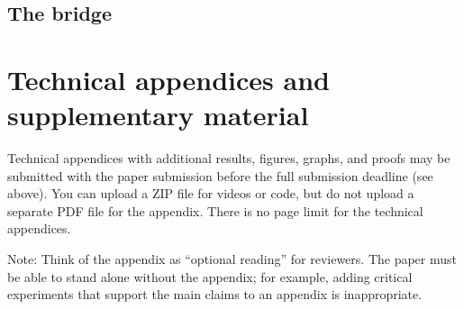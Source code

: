 \documentclass{article}
\begin{document}
\subsection{The bridge}

{
\small


}


\appendix

\section{Technical appendices and supplementary material}
Technical appendices with additional results, figures, graphs, and proofs may be submitted with the paper submission before the full submission deadline (see above). You can upload a ZIP file for videos or code, but do not upload a separate PDF file for the appendix. There is no page limit for the technical appendices. 

Note: Think of the appendix as ``optional reading'' for reviewers. The paper must be able to stand alone without the appendix; for example, adding critical experiments that support the main claims to an appendix is inappropriate. 


\newpage

\end{document}
